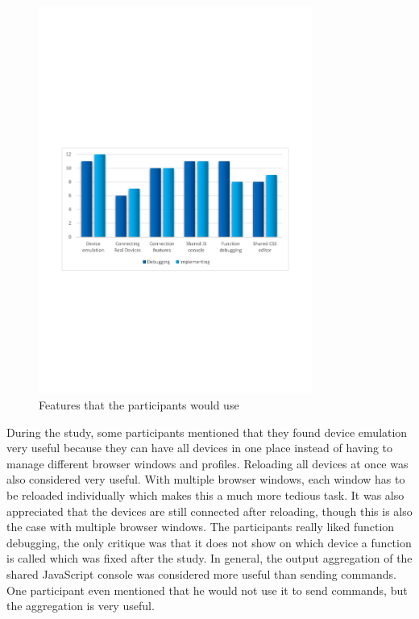 \begin{figure}[H]
  \centering
    \includegraphics[width=0.8\textwidth]{images/charts/would_use_features.pdf}
	\caption[Features that participants would use]{Features that the participants would use}
	\label{fig:would_use_features}
\end{figure}

During the study, some participants mentioned that they found device emulation very useful because they can have all devices in one place instead of having to manage different browser windows and profiles. Reloading all devices at once was also considered very useful. With multiple browser windows, each window has to be reloaded individually which makes this a much more tedious task. It was also appreciated that the devices are still connected after reloading, though this is also the case with multiple browser windows. The participants really liked function debugging, the only critique was that it does not show on which device a function is called which was fixed after the study. In general, the output aggregation of the shared JavaScript console was considered more useful than sending commands. One participant even mentioned that he would not use it to send commands, but the aggregation is very useful. 

